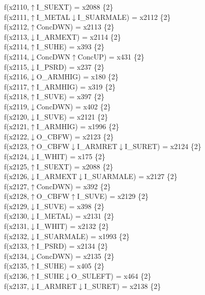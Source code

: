 f(x2110,$\uparrow$I\_SUEXT) = x2088 \{2\} \\  
f(x2111,$\uparrow$I\_METAL$\downarrow$I\_SUARMALE) = x2112 \{2\} \\  
f(x2112,$\uparrow$ConcDWN) = x2113 \{2\} \\  
f(x2113,$\downarrow$I\_ARMEXT) = x2114 \{2\} \\  
f(x2114,$\uparrow$I\_SUHE) = x393 \{2\} \\  
f(x2114,$\downarrow$ConcDWN$\uparrow$ConcUP) = x431 \{2\} \\  
f(x2115,$\downarrow$I\_PSRD) = x237 \{2\} \\  
f(x2116,$\downarrow$O\_ARMHIG) = x180 \{2\} \\  
f(x2117,$\uparrow$I\_ARMHIG) = x319 \{2\} \\  
f(x2118,$\uparrow$I\_SUVE) = x397 \{2\} \\  
f(x2119,$\downarrow$ConcDWN) = x402 \{2\} \\  
f(x2120,$\downarrow$I\_SUVE) = x2121 \{2\} \\  
f(x2121,$\uparrow$I\_ARMHIG) = x1996 \{2\} \\  
f(x2122,$\downarrow$O\_CBFW) = x2123 \{2\} \\  
f(x2123,$\uparrow$O\_CBFW$\downarrow$I\_ARMRET$\downarrow$I\_SURET) = x2124 \{2\} \\  
f(x2124,$\downarrow$I\_WHIT) = x175 \{2\} \\  
f(x2125,$\uparrow$I\_SUEXT) = x2088 \{2\} \\  
f(x2126,$\downarrow$I\_ARMEXT$\downarrow$I\_SUARMALE) = x2127 \{2\} \\  
f(x2127,$\uparrow$ConcDWN) = x392 \{2\} \\  
f(x2128,$\uparrow$O\_CBFW$\uparrow$I\_SUVE) = x2129 \{2\} \\  
f(x2129,$\downarrow$I\_SUVE) = x398 \{2\} \\  
f(x2130,$\downarrow$I\_METAL) = x2131 \{2\} \\  
f(x2131,$\downarrow$I\_WHIT) = x2132 \{2\} \\  
f(x2132,$\downarrow$I\_SUARMALE) = x1993 \{2\} \\  
f(x2133,$\uparrow$I\_PSRD) = x2134 \{2\} \\  
f(x2134,$\downarrow$ConcDWN) = x2135 \{2\} \\  
f(x2135,$\uparrow$I\_SUHE) = x405 \{2\} \\  
f(x2136,$\uparrow$I\_SUHE$\downarrow$O\_SULEFT) = x464 \{2\} \\  
f(x2137,$\downarrow$I\_ARMRET$\downarrow$I\_SURET) = x2138 \{2\} \\  

